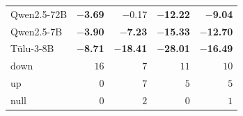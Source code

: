 \begin{center}
\begin{tabular}{lrrrr}
Qwen2.5-72B & \textbf{$-$3.69} & $-$0.17 & \textbf{$-$12.22} & \textbf{$-$9.04} \\
Qwen2.5-7B & \textbf{$-$3.90} & \textbf{$-$7.23} & \textbf{$-$15.33} & \textbf{$-$12.70} \\
T\"ulu-3-8B & \textbf{$-$8.71} & \textbf{$-$18.41} & \textbf{$-$28.01} & \textbf{$-$16.49} \\
\midrule
down & $16$ & $7$ & $11$ & $10$ \\
up & $0$ & $7$ & $5$ & $5$ \\
null & $0$ & $2$ & $0$ & $1$ \\
\bottomrule\end{tabular}\end{center}
